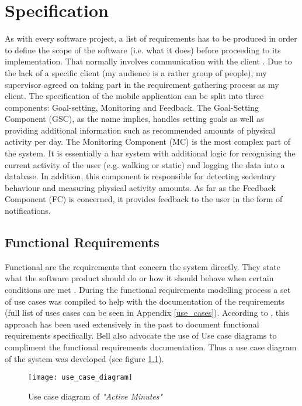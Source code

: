 \chapter{Specification}
\label{Chapter:Specification}

As with every software project, a list of requirements has to be produced in order to define the scope of the software (i.e. what it does) before proceeding to its implementation. That normally involves communication with the client \citep[23]{bell2005}. Due to the lack of a specific client (my audience is a rather group of people), my supervisor agreed on taking part in the requirement gathering process as my client. The specification of the mobile application can be split into three components: Goal-setting, Monitoring and Feedback. The Goal-Setting Component (GSC), as the name implies, handles setting goals as well as providing additional information such as recommended amounts of physical activity per day. The Monitoring Component (MC) is the most complex part of the system. It is essentially a \gls{har} system with additional logic for recognising the current activity of the user (e.g. walking or static) and logging the data into a database. In addition, this component is responsible for detecting sedentary behaviour and measuring physical activity amounts. As far as the Feedback Component (FC) is concerned, it provides feedback to the user in the form of notifications.

\section{Functional Requirements}
    Functional are the requirements that concern the system directly. They state what the software product should do or how it should behave when certain conditions are met \citep[84]{sommerville2010}. During the functional requirements modelling process a set of use cases was compiled to help with the documentation of the requirements (full list of uses cases can be seen in Appendix \ref{use_cases}). According to \citet[45]{bell2005}, this approach has been used extensively in the past to document functional requirements specifically. Bell also advocate the use of Use case diagrams to compliment the functional requirements documentation. Thus a use case diagram of the system was developed (see figure \ref{fig:use-case-diagram}).
    
    \begin{figure}
        \centering
        \texttt{[image: use\_case\_diagram]}
        \caption{Use case diagram of \textit{"Active Minutes"}}
        \label{fig:use-case-diagram}
    \end{figure}
    
